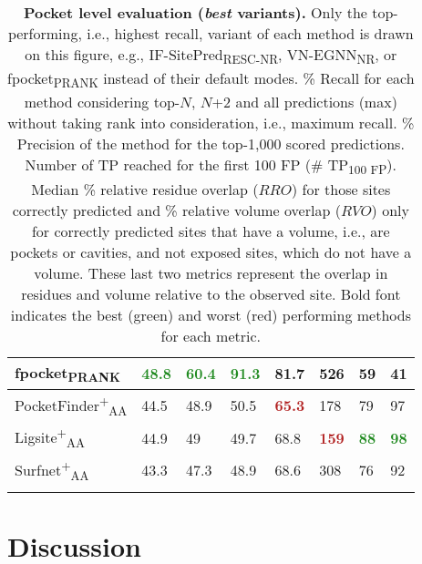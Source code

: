 \begin{landscape}
\begin{longtable}[c]{|M{33mm}|M{27mm}|M{29mm}|M{24mm}|M{27mm}|M{21mm}|M{19mm}|M{19mm}|}
fpocket\textsubscript{PRANK}       & \textbf{\textcolor{forestgreen}{48.8}}           & \textbf{\textcolor{forestgreen}{60.4}} & \textbf{\textcolor{forestgreen}{91.3}}         & 81.7           & 526         & 59     & 41     \\ \hline
PocketFinder\textsuperscript{+}\textsubscript{AA}    & 44.5           & 48.9             & 50.5         & \textbf{\textcolor{firebrick}{65.3}}           & 178         & 79     & 97     \\ \hline
Ligsite\textsuperscript{+}\textsubscript{AA}         & 44.9           & 49               & 49.7         & 68.8           & \textbf{\textcolor{firebrick}{159}}         & \textbf{\textcolor{forestgreen}{88}}     & \textbf{\textcolor{forestgreen}{98}}     \\ \hline
Surfnet\textsuperscript{+}\textsubscript{AA}         & 43.3           & 47.3             & 48.9         & 68.6           & 308         & 76     & 92     \\ \hline
\caption[Pocket level evaluation (\textit{best} variants)]{\textbf{Pocket level evaluation (\textit{best} variants).} Only the top-performing, i.e., highest recall, variant of each method is drawn on this figure, e.g., IF-SitePred\textsubscript{RESC-NR}, VN-EGNN\textsubscript{NR}, or fpocket\textsubscript{PRANK} instead of their default modes. \% Recall for each method considering top-$N$, $N$+2 and all predictions (max) without taking rank into consideration, i.e., maximum recall. \% Precision of the method for the top-1,000 scored predictions. Number of TP reached for the first 100 FP (\# TP\textsubscript{100 FP}). Median \% relative residue overlap ($RRO$) for those sites correctly predicted and \% relative volume overlap ($RVO$) only for correctly predicted sites that have a volume, i.e., are pockets or cavities, and not exposed sites, which do not have a volume. These last two metrics represent the overlap in residues and volume relative to the observed site. Bold font indicates the best (green) and worst (red) performing methods for each metric.}
\label{tab:pocket_level_benchmark_variants}\\
\end{longtable}
\end{landscape}

\section{Discussion}


